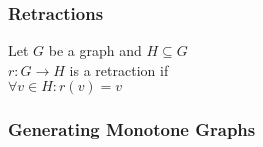 \documentclass[a4paper,handout]{beamer}
\theoremstyle{definition}
\begin{document}
\begin{frame}
\frametitle{Retractions}
\begin{definition}[Retraction]
\begin{minipage}{0.49\linewidth}
Let \(G\) be a graph and \(H \subseteq G\)\\
\(r: G\to H\) is a retraction if\\
\(\forall v\in H : r(v) = v\)
\end{minipage}
\end{definition}
\end{frame}

\begin{frame}
\frametitle{Generating Monotone Graphs}
\end{frame}
\end{document}
